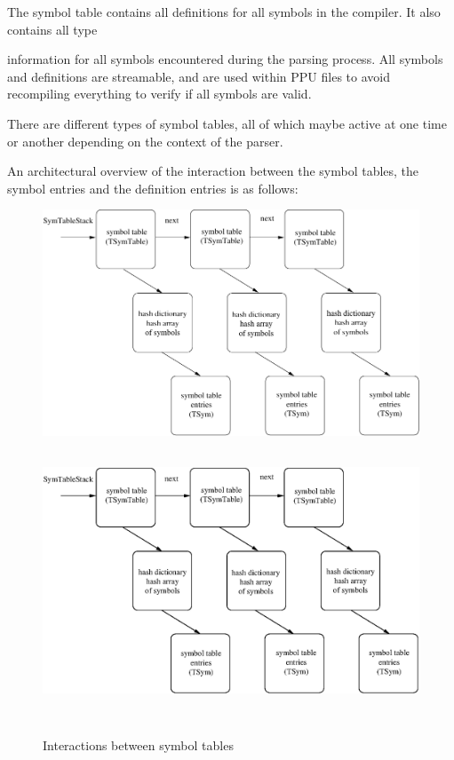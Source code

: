 \documentclass [12pt]{article}
\begin{document}
The symbol table contains all definitions for all symbols in the compiler. 
It also contains all type 

\noindent
information for all symbols encountered during the parsing process. All 
symbols and definitions are streamable, and are used within PPU files to 
avoid recompiling everything to verify if all symbols are valid.

There are different types of symbol tables, all of which maybe active at one 
time or another depending on the context of the parser. 

An architectural overview of the interaction between the symbol tables, the 
symbol entries and the definition entries is as follows:

\begin{figure}
\ifpdf
\includegraphics{arch4.pdf}
\else
\includegraphics[width=6.29in,height=3.29in]{arch4.eps}
\fi
\label{fig4}
\caption{Interactions between symbol tables}
\end{figure}
\end{document}
